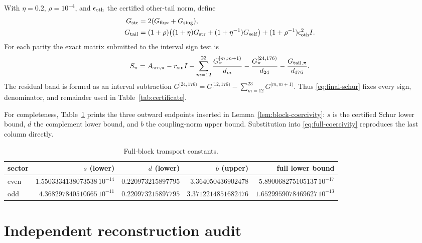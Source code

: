 \documentclass[10pt]{article}
\begin{document}
With $\eta=0.2$, $\rho=10^{-4}$, and $\epsilon_{\rm oth}$ the certified
other-tail norm, define
\begin{align}
 G_{\rm str}&=2(G_{\rm flux}+G_{\rm sing}),\\
 G_{\rm tail}&=(1+\rho)\bigl((1+\eta)G_{\rm str}
 +(1+\eta^{-1})G_{\rm self}\bigr)
 +(1+\rho^{-1})\epsilon_{\rm oth}^2I.\label{eq:tail-majorant}
\end{align}
For each parity the exact matrix submitted to the interval sign test is
\begin{equation}\label{eq:final-schur}
 S_\pi=A_{{\rm src},\pi}-r_{\rm sm}I
 -\sum_{m=12}^{23}\frac{G_\pi^{[m,m+1)}}{d_m}
 -\frac{G_\pi^{[24,176)}}{d_{24}}
 -\frac{G_{{\rm tail},\pi}}{d_{176}}.
\end{equation}
The residual band is formed as an interval subtraction
$G^{[24,176)}=G^{[12,176)}-\sum_{m=12}^{23}G^{[m,m+1)}$.
Thus \eqref{eq:final-schur} fixes every sign, denominator, and remainder used
in Table~\ref{tab:certificate}.

For completeness, Table~\ref{tab:block-transport} prints the three outward
endpoints inserted in Lemma~\ref{lem:block-coercivity}: $s$ is the certified
Schur lower bound, $d$ the complement lower bound, and $b$ the coupling-norm
upper bound.  Substitution into \eqref{eq:full-coercivity} reproduces the last
column directly.
\begin{table}[H]\small
\centering
\caption{Full-block transport constants.}
\label{tab:block-transport}
\begin{tabular}{@{}lrrrr@{}}
\toprule
sector & $s$ (lower) & $d$ (lower) & $b$ (upper) & full lower bound\\
\midrule
even & $1.5503334138073538\,10^{-14}$ & $0.220973215897795$
& $3.364050436902478$ & $5.890068275105137\,10^{-17}$\\
odd & $4.368297840510665\,10^{-11}$ & $0.220973215897795$
& $3.3712214851682476$ & $1.6529959078469627\,10^{-13}$\\
\bottomrule
\end{tabular}
\end{table}

\section{Independent reconstruction audit}
\end{document}
